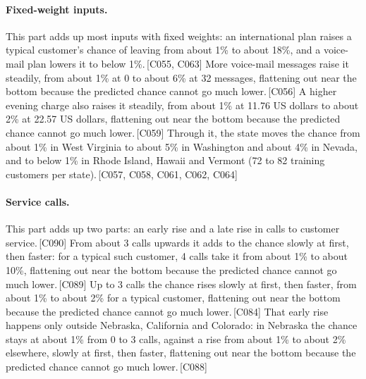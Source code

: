 \documentclass[a4paper,10pt]{article}
\newif\ifreviewmarks
\newcommand{\reviewrule}{\noindent{\color{BrickRed}\rule{\linewidth}{0.8pt}}}
\newenvironment{drafted}[1][]{%
  \ifreviewmarks\par\addvspace{\medskipamount}\reviewrule\par\nopagebreak
  \noindent{\color{BrickRed}\sffamily\footnotesize\textbf{Thesis Draft}\quad #1\hfill review}\par\nopagebreak\smallskip\fi}{%
  \ifreviewmarks\par\smallskip\noindent{\color{BrickRed}\sffamily\footnotesize end of thesis draft}\par\nopagebreak\reviewrule\par\medskip\fi}
\begin{document}
\begin{drafted}[plain-language layer: churn100-s4-c3]
\paragraph{Fixed-weight inputs.} This part adds up most inputs with fixed weights: an international plan raises a typical customer's chance of leaving from about 1\% to about 18\%, and a voice-mail plan lowers it to below 1\%.\,{\scriptsize\textcolor{NavyBlue}{[C055, C063]}} More voice-mail messages raise it steadily, from about 1\% at 0 to about 6\% at 32 messages, flattening out near the bottom because the predicted chance cannot go much lower.\,{\scriptsize\textcolor{NavyBlue}{[C056]}} A higher evening charge also raises it steadily, from about 1\% at 11.76 US dollars to about 2\% at 22.57 US dollars, flattening out near the bottom because the predicted chance cannot go much lower.\,{\scriptsize\textcolor{NavyBlue}{[C059]}} Through it, the state moves the chance from about 1\% in West Virginia to about 5\% in Washington and about 4\% in Nevada, and to below 1\% in Rhode Island, Hawaii and Vermont (72 to 82 training customers per state).\,{\scriptsize\textcolor{NavyBlue}{[C057, C058, C061, C062, C064]}}
\paragraph{Service calls.} This part adds up two parts: an early rise and a late rise in calls to customer service.\,{\scriptsize\textcolor{NavyBlue}{[C090]}} From about 3 calls upwards it adds to the chance slowly at first, then faster: for a typical such customer, 4 calls take it from about 1\% to about 10\%, flattening out near the bottom because the predicted chance cannot go much lower.\,{\scriptsize\textcolor{NavyBlue}{[C089]}} Up to 3 calls the chance rises slowly at first, then faster, from about 1\% to about 2\% for a typical customer, flattening out near the bottom because the predicted chance cannot go much lower.\,{\scriptsize\textcolor{NavyBlue}{[C084]}} That early rise happens only outside Nebraska, California and Colorado: in Nebraska the chance stays at about 1\% from 0 to 3 calls, against a rise from about 1\% to about 2\% elsewhere, slowly at first, then faster, flattening out near the bottom because the predicted chance cannot go much lower.\,{\scriptsize\textcolor{NavyBlue}{[C088]}}

\end{drafted}
\end{document}
